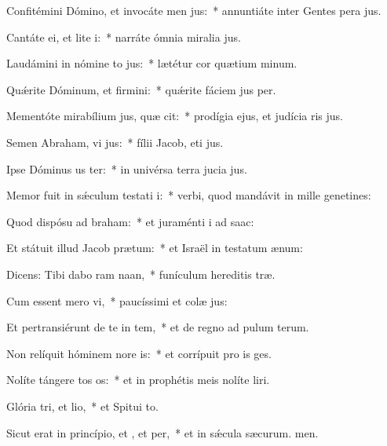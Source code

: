 \item Confitémini Dómino, et invocáte men jus:~* annuntiáte inter Gentes pera jus.
\item Cantáte ei, et lite i:~* narráte ómnia miralia jus.
\item Laudámini in nómine to jus:~* lætétur cor quætium minum.
\item Quǽrite Dóminum, et firmini:~* quǽrite fáciem jus per.
\item Mementóte mirabílium jus, quæ cit:~* prodígia ejus, et judícia ris jus.
\item Semen Abraham, vi jus:~* fílii Jacob, eti jus.
\item Ipse Dóminus us ter:~* in univérsa terra jucia jus.
\item Memor fuit in sǽculum testati i:~* verbi, quod mandávit in mille genetines:
\item Quod dispósu ad braham:~* et juraménti i ad saac:
\item Et státuit illud Jacob  prætum:~* et Israël in testatum ænum:
\item Dicens: Tibi dabo ram naan,~* funículum hereditis træ.
\item Cum essent mero vi,~* paucíssimi et colæ jus:
\item Et pertransiérunt de te in tem,~* et de regno ad pulum terum.
\item Non relíquit hóminem nore is:~* et corrípuit pro is ges.
\item Nolíte tángere tos os:~* et in prophétis meis nolíte liri.
\item Glória tri, et lio,~* et Spitui to.
\item Sicut erat in princípio, et , et per,~* et in sǽcula sæcurum. men.
